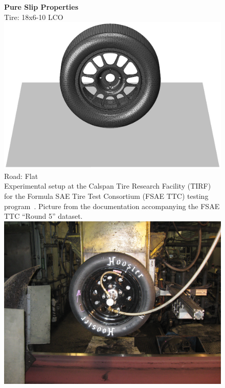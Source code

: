 \begin{figure}
  \centering
  \begin{minipage}[c]{0.70\linewidth}
    \raggedleft
  \end{minipage}%
  \hfill
  \begin{minipage}[c]{0.29\linewidth}
    \centering
    \textbf{Pure Slip Properties} \\[0.4em]
    Tire: \Hoosier{} 18x6-10 LCO \\[0.4em]
    \includegraphics[width=1.0\linewidth, trim={13.5cm 4.25cm 11.5cm 6.0cm}, clip]{./figures/chapter_4/render_hoosier}
    Road: Flat \\[4.0em]
    Experimental setup at the Calspan Tire Research Facility (TIRF) for the Formula SAE Tire Test Consortium (FSAE TTC) testing program~\cite{kasprzak2006formula}. Picture from the documentation accompanying the FSAE TTC ``Round 5'' dataset. \\[0.4em]
    \includegraphics[width=0.9\linewidth]{./figures/chapter_4/hoosier_calspan}

\end{minipage}
\end{figure}
